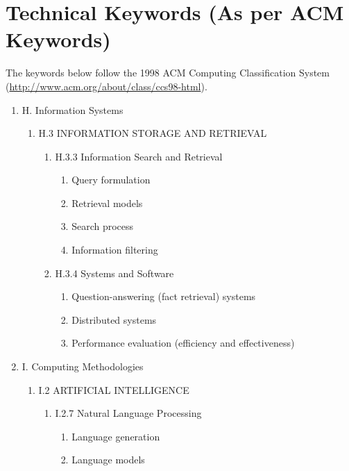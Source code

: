 \documentclass[oneside,a4paper,12pt]{report}
\begin{document}
\section{Technical Keywords (As per ACM Keywords)}
The keywords below follow the 1998 ACM Computing Classification System (\url{http://www.acm.org/about/class/ccs98-html}).
\begin{enumerate}
	\item H. Information Systems
	\begin{enumerate}
		\item H.3 INFORMATION STORAGE AND RETRIEVAL
		\begin{enumerate}
			\item H.3.3 Information Search and Retrieval
			\begin{enumerate}
				\item Query formulation
				\item Retrieval models
				\item Search process
				\item Information filtering
			\end{enumerate}
			\item H.3.4 Systems and Software
			\begin{enumerate}
				\item Question-answering (fact retrieval) systems
				\item Distributed systems
				\item Performance evaluation (efficiency and effectiveness)
			\end{enumerate}
		\end{enumerate}
	\end{enumerate}
	\item I. Computing Methodologies
	\begin{enumerate}
		\item I.2 ARTIFICIAL INTELLIGENCE
		\begin{enumerate}
			\item I.2.7 Natural Language Processing
			\begin{enumerate}
				\item Language generation
				\item Language models

\end{enumerate}
\end{enumerate}
\end{enumerate}
\end{enumerate}
\end{document}
